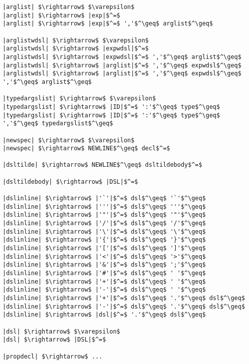 \begin{lstlisting}[mathescape]
|arglist| $\rightarrow$ $\varepsilon$
|arglist| $\rightarrow$ |exp|$^=$
|arglist| $\rightarrow$ |exp|$^=$ ','$^\geq$ arglist$^\geq$

|arglistwdsl| $\rightarrow$ $\varepsilon$
|arglistwdsl| $\rightarrow$ |expwdsl|$^=$
|arglistwdsl| $\rightarrow$ |expwdsl|$^=$ ','$^\geq$ arglist$^\geq$
|arglistwdsl| $\rightarrow$ |arglist|$^=$ ','$^\geq$ expwdsl$^\geq$
|arglistwdsl| $\rightarrow$ |arglist|$^=$ ','$^\geq$ expwdsl$^\geq$ ','$^\geq$ arglist$^\geq$

|typedargslist| $\rightarrow$ $\varepsilon$
|typedargslist| $\rightarrow$ |ID|$^=$ ':'$^\geq$ type$^\geq$
|typedargslist| $\rightarrow$ |ID|$^=$ ':'$^\geq$ type$^\geq$ ','$^\geq$ typedargslist$^\geq$

|newspec| $\rightarrow$ $\varepsilon$
|newspec| $\rightarrow$ NEWLINE$^\geq$ decl$^=$

|dsltilde| $\rightarrow$ NEWLINE$^\geq$ dsltildebody$^=$

|dsltildebody| $\rightarrow$ |DSL|$^=$

|dslinline| $\rightarrow$ |'`'|$^=$ dsl$^\geq$ '`'$^\geq$
|dslinline| $\rightarrow$ |'''|$^=$ dsl$^\geq$ '''$^\geq$
|dslinline| $\rightarrow$ |'"'|$^=$ dsl$^\geq$ '"'$^\geq$
|dslinline| $\rightarrow$ |'/'|$^=$ dsl$^\geq$ '/'$^\geq$
|dslinline| $\rightarrow$ |'\'|$^=$ dsl$^\geq$ '\'$^\geq$
|dslinline| $\rightarrow$ |'{'|$^=$ dsl$^\geq$ '}'$^\geq$
|dslinline| $\rightarrow$ |'['|$^=$ dsl$^\geq$ ']'$^\geq$
|dslinline| $\rightarrow$ |'<'|$^=$ dsl$^\geq$ '>'$^\geq$
|dslinline| $\rightarrow$ |'&'|$^=$ dsl$^\geq$ ';'$^\geq$
|dslinline| $\rightarrow$ |'#'|$^=$ dsl$^\geq$ ' '$^\geq$
|dslinline| $\rightarrow$ |'+'|$^=$ dsl$^\geq$ ' '$^\geq$
|dslinline| $\rightarrow$ |'-'|$^=$ dsl$^\geq$ ' '$^\geq$
|dslinline| $\rightarrow$ |'+'|$^=$ dsl$^\geq$ '.'$^\geq$ dsl$^\geq$
|dslinline| $\rightarrow$ |'-'|$^=$ dsl$^\geq$ '.'$^\geq$ dsl$^\geq$
|dslinline| $\rightarrow$ |dsl|$^=$ '.'$^\geq$ dsl$^\geq$

|dsl| $\rightarrow$ $\varepsilon$
|dsl| $\rightarrow$ |DSL|$^=$

|propdecl| $\rightarrow$ ...
\end{lstlisting}
